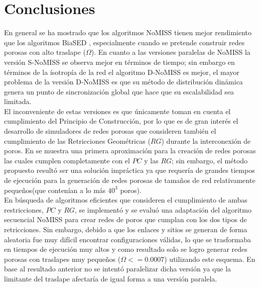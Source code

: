 
\section{Conclusiones}
\label{sec:rwconclutions}
En general se ha mostrado que los algoritmos NoMISS tienen mejor rendimiento que los algoritmos BiaSED \cite{ref3}, especialmente cuando se pretende construir redes porosas con alto traslape ($\Omega$). En cuanto a las versiones paralelas de NoMISS la versión S-NoMISS se observa mejor  en términos de tiempo; sin embargo en términos de la ísotropía de la red el algoritmo D-NoMISS es mejor, el mayor problema de la versión  D-NoMISS es que su método de distribución dinámica genera un punto de sincronizaci\'on global que hace que su escalabilidad sea limitada.\\

El inconveniente de estas versiones es que \'unicamente toman en cuenta el cumplimiento del Principio de Construcci\'on, por lo que  es de gran inter\'es el desarrollo de simuladores de redes porosas que consideren tambi\'en el cumplimiento de las  Retricciones Geom\'etricas ($RG$) durante la interconexión de poros. En \cite{ref5} se muestra una primera aproximación para 
la creación de redes porosas las cuales cumplen  completamente con el $PC$ y las $RG$; sin embargo, el método propuesto result\'o ser una solución impráctica ya que requería de grandes tiempos de ejecución para la generación de redes porosas de tamaños de red relativamente pequeños(que contenían a lo más $40^3$ poros).\\

En b\'usqueda de algoritmos eficientes que consideren el cumplimiento de ambas restricciones, $PC$ y $RG$, se implement\'o y se evaluó una adaptaci\'on del algoritmo secuencial NoMISS \cite{ref16} para crear redes de poros que cumplan con los dos tipos de retricciones. Sin embargo, debido a que los enlaces y sitios se generan de forma aleatoria 
fue muy difícil encontrar configuraciones válidas, lo que se trasformaba en tiempos de ejecución muy altos y como resultado solo 
se logro generar redes porosas con traslapes muy pequeños ($\Omega<=0.0007$) utilizando este esquema. En base al resultado 
anterior no se intent\'o paralelizar dicha versión ya que la limitante del traslape afectaría de igual forma a una versión paralela.\\

